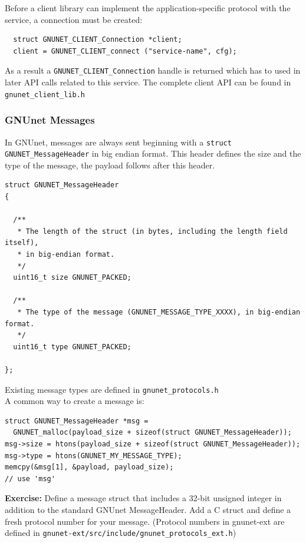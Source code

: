 \documentclass[10pt]{article}
\newcommand{\exercise}[1]{\noindent\begin{boxedminipage}{\textwidth}{\bf Exercise:} #1 \end{boxedminipage}}
\begin{document}
Before a client library can implement the application-specific protocol
with the service, a connection must be created:

\lstset{language=c}
\begin{lstlisting}
  struct GNUNET_CLIENT_Connection *client;
  client = GNUNET_CLIENT_connect ("service-name", cfg);
\end{lstlisting}

As a result a {\tt GNUNET\_CLIENT\_Connection} handle is returned
which has to used in later API calls related to this service.
The complete client API can be found in {\tt gnunet\_client\_lib.h}

\subsubsection{GNUnet Messages}

In GNUnet, messages are always sent beginning with a {\tt struct GNUNET\_MessageHeader}
in big endian format. This header defines the size and the type of the
message, the payload follows after this header.

\lstset{language=c}
\begin{lstlisting}
struct GNUNET_MessageHeader
{

  /**
   * The length of the struct (in bytes, including the length field itself),
   * in big-endian format.
   */
  uint16_t size GNUNET_PACKED;

  /**
   * The type of the message (GNUNET_MESSAGE_TYPE_XXXX), in big-endian format.
   */
  uint16_t type GNUNET_PACKED;

};
\end{lstlisting}

Existing message types are defined in {\tt gnunet\_protocols.h}\\
A common way to create a message is:

\lstset{language=c}
\begin{lstlisting}
struct GNUNET_MessageHeader *msg =
  GNUNET_malloc(payload_size + sizeof(struct GNUNET_MessageHeader));
msg->size = htons(payload_size + sizeof(struct GNUNET_MessageHeader));
msg->type = htons(GNUNET_MY_MESSAGE_TYPE);
memcpy(&msg[1], &payload, payload_size);
// use 'msg'
\end{lstlisting}

\exercise{Define a message struct that includes a 32-bit
unsigned integer in addition to the standard GNUnet MessageHeader.
Add a C struct and define a fresh protocol number for your message.
(Protocol numbers in gnunet-ext are defined in \lstinline|gnunet-ext/src/include/gnunet_protocols_ext.h|)}
\end{document}
